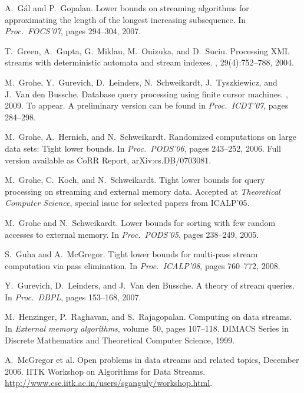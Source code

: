 \documentclass[proceedings]{stacs}
\theoremstyle{plain}\newtheorem{satz}[thm]{Satz}
\theoremstyle{definition}\newtheorem{crucial}[thm]{Crucial Definition}
\begin{document}
\begin{thebibliography}{10}
A.~G{\'a}l and P.~Gopalan.
\newblock Lower bounds on streaming algorithms for approximating the length of
  the longest increasing subsequence.
\newblock In {\em Proc.\ FOCS'07}, pages 294--304, 2007.

T.~Green, A.~Gupta, G.~Miklau, M.~Onizuka, and D.~Suciu.
\newblock Processing {XML} streams with deterministic automata and stream
  indexes.
, 29(4):752--788, 2004.

M.~Grohe, Y.~Gurevich, D.~Leinders, N.~Schweikardt, J.~Tyszkiewicz, and J.~{Van
  den Bussche}.
\newblock Database query processing using finite cursor machines.
, 2009.
\newblock To appear. A preliminary version can be found in \emph{Proc.\
  ICDT'07}, pages 284--298.

M.~Grohe, A.~Hernich, and N.~Schweikardt.
\newblock Randomized computations on large data sets: Tight lower bounds.
\newblock In {\em Proc.\ PODS'06}, pages 243--252, 2006.
\newblock Full version available as CoRR Report, arXiv:cs.DB/0703081.

M.~Grohe, C.~Koch, and N.~Schweikardt.
\newblock Tight lower bounds for query processing on streaming and external
  memory data.
\newblock Accepted at \emph{Theoretical Computer Science}, special issue for
  selected papers from ICALP'05.

M.~Grohe and N.~Schweikardt.
\newblock Lower bounds for sorting with few random accesses to external memory.
\newblock In {\em Proc.\ PODS'05}, pages 238--249, 2005.

S.~Guha and A.~McGregor.
\newblock Tight lower bounds for multi-pass stream computation via pass
  elimination.
\newblock In {\em Proc.\ ICALP'08}, pages 760--772, 2008.

Y.~Gurevich, D.~Leinders, and J.~{Van den Bussche}.
\newblock A theory of stream queries.
\newblock In {\em Proc.\ DBPL}, pages 153--168, 2007.

M.~Henzinger, P.~Raghavan, and S.~Rajagopalan.
\newblock Computing on data streams.
\newblock In {\em External memory algorithms}, volume~50, pages 107--118.
  DIMACS Series in Discrete Mathematics and Theoretical Computer Science, 1999.

A.~{McGregor et al.}
\newblock Open problems in data streams and related topics, December 2006.
\newblock IITK Workshop on Algorithms for Data Streams. 
  \url{http://www.cse.iitk.ac.in/users/sganguly/workshop.html}.


\end{thebibliography}
\end{document}

